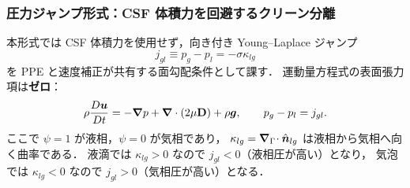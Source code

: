 \subsubsection{圧力ジャンプ形式：CSF 体積力を回避するクリーン分離}
\label{sec:split_ppe_pressure_jump_formulation}

本形式では CSF 体積力を使用せず，向き付き Young--Laplace
ジャンプ
\begin{equation}
  j_{gl} \equiv p_g-p_l = -\sigma\kappa_{lg}
  \label{eq:split_ppe_oriented_jump}
\end{equation}
を PPE と速度補正が共有する面勾配条件として課す．
運動量方程式の表面張力項は\textbf{ゼロ}：
\begin{equation}
  \rho\frac{D\bm{u}}{Dt}
    = -\bm{\nabla} p + \bm{\nabla}\cdot(2\mu\mathbf{D}) + \rho\bm{g},
  \qquad p_g-p_l = j_{gl}.
  \label{eq:split_ppe_momentum_no_csf}
\end{equation}
ここで $\psi=1$ が液相，$\psi=0$ が気相であり，
$\kappa_{lg}=\bm{\nabla}_\Gamma\!\cdot\hat{\bm n}_{lg}$ は液相から気相へ向く曲率である．
液滴では $\kappa_{lg}>0$ なので $j_{gl}<0$（液相圧が高い）となり，
気泡では $\kappa_{lg}<0$ なので $j_{gl}>0$（気相圧が高い）となる．

